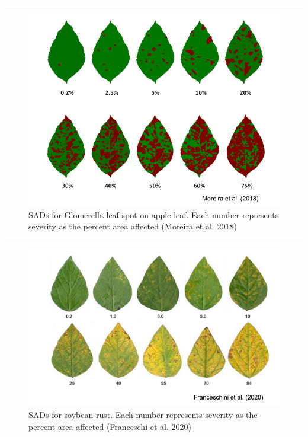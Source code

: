 \documentclass[
  letterpaper,
]{book}
\begin{document}
\begin{center}\rule{0.5\linewidth}{0.5pt}\end{center}

\begin{figure}

{\centering \includegraphics[width=6.47917in,height=\textheight]{imgs/sad-apple.png}

}

\caption{\label{fig-sad-apple}SADs for Glomerella leaf spot on apple
leaf. Each number represents severity as the percent area affected
(Moreira et al. 2018)}

\end{figure}

\begin{center}\rule{0.5\linewidth}{0.5pt}\end{center}

\begin{figure}

{\centering \includegraphics[width=6.51042in,height=\textheight]{imgs/sad-sbr.png}

}

\caption{\label{fig-sad-sbr}SADs for soybean rust. Each number
represents severity as the percent area affected (Franceschi et al.
2020)}

\end{figure}
\end{document}
